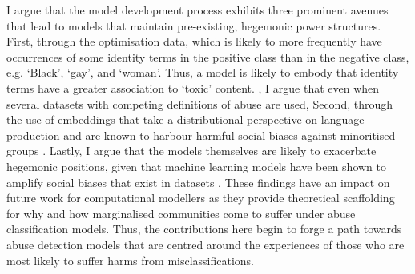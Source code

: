  I argue that the model development process exhibits three prominent avenues that lead to models that maintain pre-existing, hegemonic power structures.
First, through the optimisation data, which is likely to more frequently have occurrences of some identity terms in the positive class than in the negative class, e.g. `Black', `gay', and `woman'.
Thus, a model is likely to embody that identity terms have a greater association to `toxic' content.
, I argue that even when several datasets with competing definitions of abuse are used, 
Second,  through the use of  embeddings that take a distributional perspective on language production and are known to harbour harmful social biases against minoritised groups \citep{Speer:2017}.
Lastly, I argue that the models themselves are likely to exacerbate hegemonic positions, given that machine learning models have been shown to amplify social biases that exist in datasets \citep{Zhao:2017}.
These findings have an impact on future work for computational modellers as they provide theoretical scaffolding for why and how marginalised communities come to suffer under abuse classification models.
Thus, the contributions here begin to forge a path towards abuse detection models that are centred around the experiences of those who are most likely to suffer harms from misclassifications.

